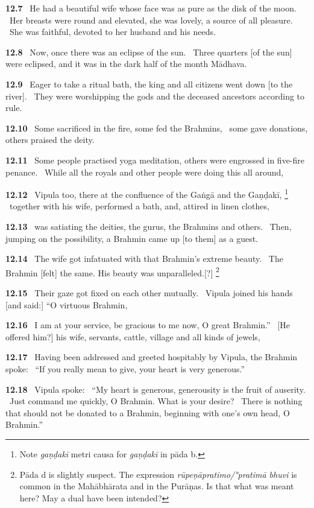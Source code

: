 \documentclass{article}
\newcommand{\skt}[1]{\textit{#1}}
\begin{document}
\textbf{12.7}%
\ He had a beautiful wife whose face was as pure as the disk of the moon.%
\ Her breasts were round and elevated, she was lovely, a source of all pleasure.%
\ She was faithful, devoted to her husband and his needs.%


\textbf{12.8}%
\ Now, once there was an eclipse of the sun.%
\ Three quarters [of the sun] were eclipsed, and it was in the dark half of the month Mādhava.%


\textbf{12.9}%
\ Eager to take a ritual bath, the king and all citizens went down [to the river].%
\ They were worshipping the gods and the deceased ancestors according to rule.%


\textbf{12.10}%
\ Some sacrificed in the fire, some fed the Brahmins,%
\ some gave donations, others praised the deity.%


\textbf{12.11}%
\ Some people practised yoga meditation, others were engrossed in five-fire penance.%
\ While all the royals and other people were doing this all around,%


\textbf{12.12}%
\ Vipula too, there at the confluence of the Gaṅgā and the Gaṇḍakī,%
\footnote{Note \skt{gaṇḍakī} metri causa for \skt{gaṇḍakī} in pāda b. }%
\ together with his wife, performed a bath, and, attired in linen clothes,%


\textbf{12.13}%
\ was satiating the deities, the gurus, the Brahmins and others.%
\ Then, jumping on the possibility, a Brahmin came up [to them] as a guest.%


\textbf{12.14}%
\ The wife got infatuated with that Brahmin's extreme beauty.%
\ The Brahmin [felt] the same. His beauty was unparalleled.[?]%
\footnote{Pāda d is slightly suspect. The expression \skt{rūpeṇāpratimo/°pratimā bhuvi} is                         common in the Mahābhārata and in the Purāṇas. Is that what was meant here?                        May a dual have been intended? }%


\textbf{12.15}%
\ Their gaze got fixed on each other mutually.%
\ Vipula joined his hands [and said:] ``O virtuous Brahmin,%


\textbf{12.16}%
\ I am at your service, be gracious to me now, O great Brahmin.''%
\ [He offered him?] his wife, servants, cattle, village and all kinds of jewels,%


\textbf{12.17}%
\ Having been addressed and greeted hospitably by Vipula, the Brahmin spoke:%
\ ``If you really mean to give, your heart is very generous.''%


\textbf{12.18}%
\ Vipula spoke:%
\ ``My heart is generous, generousity is the fruit of auserity.%
\ Just command me quickly, O Brahmin. What is your desire?%
\ There is nothing that should not be donated to a Brahmin, beginning with one's own head, O Brahmin.''%
\end{document}
